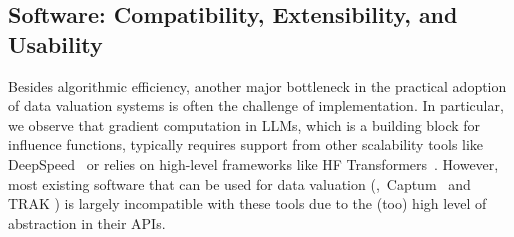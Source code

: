 \subsection{Software: Compatibility, Extensibility, and Usability}
\label{sec:software}
Besides algorithmic efficiency, another major bottleneck in the practical adoption of data valuation systems is often the challenge of implementation. In particular, we observe that gradient computation in LLMs, which is a building block for influence functions, typically requires support from other scalability tools like DeepSpeed~\cite{rasley2020deepspeed} or relies on high-level frameworks like HF Transformers~\cite{wolf-etal-2020-transformers}. However, most existing software that can be used for data valuation (\eg,\ Captum~\cite{kokhlikyan2020captum} and TRAK \cite{park2023trak}) is largely incompatible with these tools due to the (too) high level of abstraction in their APIs. 

